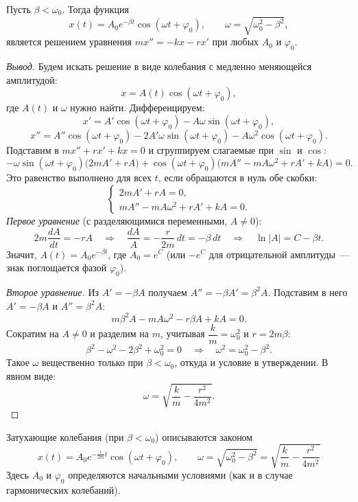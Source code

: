 \documentclass[12pt]{article}
\begin{document}
	\begin{statement}
		Пусть $\beta < \omega_0$. Тогда функция
		\[
			x(t) = A_0 e^{-\beta t} \cos (\omega t + \varphi_0), \qquad \omega = \sqrt{\omega_0^2 - \beta^2},
		\]
		является решением уравнения $mx'' = -kx - rx'$ при любых $A_0$ и $\varphi_0$.
	\end{statement}
	\begin{proof}[Вывод]
		Будем искать решение в виде колебания с медленно меняющейся амплитудой:
		\[
			x = A(t) \cos (\omega t + \varphi_0),
		\]
		где $A(t)$ и $\omega$ нужно найти. Дифференцируем:
		\[
			x' = A' \cos (\omega t + \varphi_0) - A \omega \sin (\omega t + \varphi_0),
		\]
		\[
			x'' = A'' \cos (\omega t + \varphi_0) - 2A' \omega \sin (\omega t + \varphi_0) - A \omega^2 \cos (\omega t + \varphi_0).
		\]
		Подставим в $mx'' + rx' + kx = 0$ и сгруппируем слагаемые при $\sin$ и $\cos$:
		\[
			-\omega \sin (\omega t + \varphi_0) \bigl( 2mA' + rA \bigr) + \cos (\omega t + \varphi_0) \bigl( mA'' - mA\omega^2 + rA' + kA \bigr) = 0.
		\]
		Это равенство выполнено для всех $t$, если обращаются в нуль обе скобки:
		\[
			\begin{cases}
				2mA' + rA = 0, \\
				mA'' - mA\omega^2 + rA' + kA = 0.
			\end{cases}
		\]
		\textit{Первое уравнение} (с разделяющимися переменными, $A \ne 0$):
		\[
			2m \dfrac{dA}{dt} = -rA \quad \Longrightarrow \quad \dfrac{dA}{A} = -\dfrac{r}{2m}\,dt = -\beta\,dt \quad \Longrightarrow \quad \ln |A| = C - \beta t.
		\]
		Значит, $A(t) = A_0 e^{-\beta t}$, где $A_0 = e^C$ (или $-e^C$ для отрицательной амплитуды~--- знак поглощается фазой $\varphi_0$).
		
		\textit{Второе уравнение.} Из $A' = -\beta A$ получаем $A'' = -\beta A' = \beta^2 A$. Подставим в него $A' = -\beta A$ и $A'' = \beta^2 A$:
		\[
			m\beta^2 A - mA\omega^2 - r\beta A + kA = 0.
		\]
		Сократим на $A \ne 0$ и разделим на $m$, учитывая $\dfrac{k}{m} = \omega_0^2$ и $r = 2m\beta$:
		\[
			\beta^2 - \omega^2 - 2\beta^2 + \omega_0^2 = 0 \quad \Longrightarrow \quad \omega^2 = \omega_0^2 - \beta^2.
		\]
		Такое $\omega$ вещественно только при $\beta < \omega_0$, откуда и условие в утверждении. В явном виде:
		\[
			\omega = \sqrt{\dfrac{k}{m} - \dfrac{r^2}{4m^2}}.
		\]
	\end{proof}
	
	\begin{statement}[Итог]
		Затухающие колебания (при $\beta < \omega_0$) описываются законом
		\[
			\boxed{x(t) = A_0 e^{-\frac{r}{2m}t} \cos (\omega t + \varphi_0), \qquad \omega = \sqrt{\omega_0^2 - \beta^2} = \sqrt{\dfrac{k}{m} - \dfrac{r^2}{4m^2}}}
		\]
		Здесь $A_0$ и $\varphi_0$ определяются начальными условиями (как и в случае гармонических колебаний).
	\end{statement}
	
\end{document}
